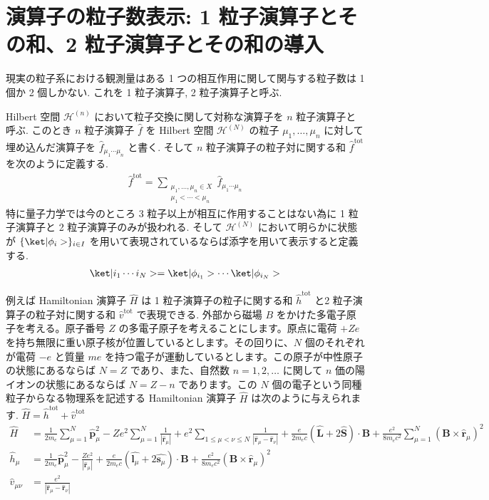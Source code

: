 \documentclass[uplatex,dvipdfmx,a4paper,11pt]{jlreq}
\newcommand{\HH}{\mathcal{H}}
\newcommand{\rr}{\bm{r}}
\newcommand{\pp}{\bm{p}}
\numberwithin{equation}{section}
\theoremstyle{definition}
\begin{document}
\section{演算子の粒子数表示: 1 粒子演算子とその和、2 粒子演算子とその和の導入}
現実の粒子系における観測量はある 1 つの相互作用に関して関与する粒子数は 1 個か 2 個しかない. これを 1 粒子演算子, 2 粒子演算子と呼ぶ.

\begin{definition}[$n$ 粒子演算子]
  Hilbert 空間 $\HH^{(n)}$ において粒子交換に関して対称な演算子を $n$ 粒子演算子と呼ぶ.
  このとき $n$ 粒子演算子 $\hat{f}$ を Hilbert 空間 $\HH^{(N)}$ の粒子 $\mu_1,\ldots,\mu_n$ に対して埋め込んだ演算子を $\hat{f}_{\mu_1\cdots\mu_n}$ と書く.
  そして $n$ 粒子演算子の粒子対に関する和 $\hat{f}^{\mathrm{tot}}$ を次のように定義する.
  \begin{align}
    \hat{f}^{\mathrm{tot}} = \sum_{\substack{\mu_1,\ldots,\mu_n\in X \\ \mu_1 < \cdots < \mu_n}}\hat{f}_{\mu_1\cdots\mu_n}
  \end{align}
  特に量子力学では今のところ 3 粒子以上が相互に作用することはない為に 1 粒子演算子と 2 粒子演算子のみが扱われる.
  そして $\HH^{(N)}$ において明らかに状態が $\{\ket|\phi_i>\}_{i\in I}$ を用いて表現されているならば添字を用いて表示すると定義する.
  \begin{align}
    \ket|i_1\cdots i_N> = \ket|\phi_{i_1}>\cdots\ket|\phi_{i_N}>
  \end{align}
\end{definition}
\begin{example}
  例えば Hamiltonian 演算子 $\hat{H}$ は 1 粒子演算子の粒子に関する和 $\hat{h}^{\mathrm{tot}}$ と2 粒子演算子の粒子対に関する和 $\hat{v}^{\mathrm{tot}}$ で表現できる.
  外部から磁場 $B$ をかけた多電子原子を考える。原子番号 $Z$ の多電子原子を考えることにします。原点に電荷 $+Ze$ を持ち無限に重い原子核が位置しているとします。その回りに、$N$ 個のそれぞれが電荷 $-e$ と質量 $me$ を持つ電子が運動しているとします。この原子が中性原子の状態にあるならば $N = Z$ であり、また、自然数 $n = 1, 2,\ldots$ に関して $n$ 価の陽イオンの状態にあるならば $N = Z - n$ であります。この $N$ 個の電子という同種粒子からなる物理系を記述する Hamiltonian 演算子 $\hat{H}$ は次のように与えられます.
  $\hat{H} = \hat{h}^{\mathrm{tot}} + \hat{v}^{\mathrm{tot}}$
  \begin{align}
    \hat{H}          & = \frac{1}{2m_e}\sum_{\mu=1}^{N}\hat{\pp}_\mu^2 - Ze^2\sum_{\mu=1}^{N}\frac{1}{|\hat{\rr}_\mu|} + e^2\sum_{1\leq\mu<\nu\leq N}\frac{1}{|\hat{\rr}_\mu - \hat{\rr}_\nu|} + \frac{e}{2m_ec}(\hat{\bm{L}} + 2\hat{\bm{S}})\cdot\bm{B} + \frac{e^2}{8m_ec^2}\sum_{\mu=1}^{N}(\bm{B}\times\hat{\rr}_\mu)^2 \\
    \hat{h}_\mu      & = \frac{1}{2m_e}\hat{\pp}_\mu^2 - \frac{Ze^2}{|\hat{\rr}_\mu|} + \frac{e}{2m_ec}(\hat{\bm{l}_\mu} + 2\hat{\bm{s}_\mu})\cdot\bm{B} + \frac{e^2}{8m_ec^2}(\bm{B}\times\hat{\rr}_\mu)^2                                                                                                                  \\
    \hat{v}_{\mu\nu} & = \frac{e^2}{|\hat{\rr}_\mu - \hat{\rr}_\nu|}
  \end{align}
\end{example}
\end{document}
